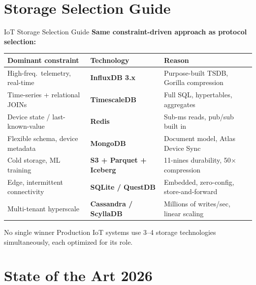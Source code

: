 \documentclass[aspectratio=169,11pt]{beamer}
\begin{document}
\section{Storage Selection Guide}

\begin{frame}{IoT Storage Selection Guide}
    \textbf{Same constraint-driven approach as protocol selection:}

    \vspace{0.05cm}
    \begin{center}
    \tiny
    \begin{tabular}{p{3.1cm}p{2.8cm}p{4.6cm}}
        \toprule
        \textbf{Dominant constraint} & \textbf{Technology} & \textbf{Reason} \\
        \midrule
        High-freq.~telemetry, real-time & \textbf{InfluxDB 3.x} & Purpose-built TSDB, Gorilla compression \\
        Time-series + relational JOINs & \textbf{TimescaleDB} & Full SQL, hypertables, aggregates \\
        Device state / last-known-value & \textbf{Redis} & Sub-ms reads, pub/sub built in \\
        Flexible schema, device metadata & \textbf{MongoDB} & Document model, Atlas Device Sync \\
        Cold storage, ML training & \textbf{S3 + Parquet + Iceberg} & 11-nines durability, 50$\times$ compression \\
        Edge, intermittent connectivity & \textbf{SQLite / QuestDB} & Embedded, zero-config, store-and-forward \\
        Multi-tenant hyperscale & \textbf{Cassandra / ScyllaDB} & Millions of writes/sec, linear scaling \\
        \bottomrule
    \end{tabular}
    \normalsize
    \end{center}

    \begin{alertblock}{No single winner}
        Production IoT systems use 3--4 storage technologies simultaneously, each optimized for its role.
    \end{alertblock}
\end{frame}

\section{State of the Art 2026}
\end{document}
